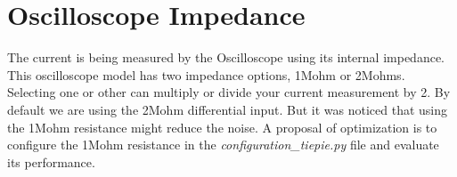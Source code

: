 \section{Oscilloscope Impedance}
\label{sec:osc_impedance}

The current is being measured by the Oscilloscope using its internal impedance. 
This oscilloscope model has two impedance options, 1Mohm or 2Mohms. 
Selecting one or other can multiply or divide your current measurement by 2. 
By default we are using the 2Mohm differential input. But it was noticed that using the 1Mohm resistance might reduce the noise. 
A proposal of optimization is to configure the 1Mohm resistance in the \emph{configuration\_tiepie.py} file and evaluate its performance.